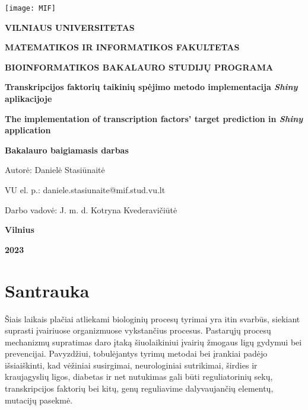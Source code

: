 \documentclass[12pt]{article}
\begin{document}

\begin{titlepage}
\vskip 20pt
\begin{center}
\texttt{[image: MIF]}
\end{center}


\vskip 20pt
\centerline{\bf \large \textbf{VILNIAUS UNIVERSITETAS}}
\bigskip
\centerline{\large \textbf{MATEMATIKOS IR INFORMATIKOS FAKULTETAS}}
\bigskip
\centerline{\large \textbf{BIOINFORMATIKOS BAKALAURO STUDIJŲ PROGRAMA}}



\vskip 90pt
\begin{center}
    {\bf \LARGE Transkripcijos faktorių taikinių spėjimo metodo implementacija
    \emph{Shiny} aplikacijoje}
\end{center}
\begin{center}
    {\bf \Large The implementation of transcription factors' target prediction
    in \emph{Shiny} application}
\end{center}
\vskip 20pt
\centerline{\bf \large \textbf{Bakalauro baigiamasis darbas}}
\bigskip
\vskip 40pt

\hskip 140pt {\large Autorė: Danielė Stasiūnaitė}

\hskip 140pt{\large VU el. p.: daniele.stasiunaite@mif.stud.vu.lt}
\bigskip
\vskip 20pt

\hskip 140pt {\large Darbo vadovė: J. m. d. Kotryna Kvederavičiūtė}
\vskip 60pt
\vskip 40pt
\centerline{\large \textbf{Vilnius}}
\centerline{\large \textbf{2023}}
\newpage
\end{titlepage}



\tableofcontents
\newpage


\section*{Santrauka}
Šiais laikais plačiai atliekami biologinių procesų tyrimai yra itin svarbūs,
siekiant suprasti įvairiuose organizmuose vykstančius procesus. Pastarųjų
procesų mechanizmų supratimas daro įtaką šiuolaikiniui įvairių žmogaus ligų
gydymui bei prevencijai. Pavyzdžiui, tobulėjantys tyrimų metodai bei įrankiai
padėjo išsiaiškinti, kad vėžiniai susirgimai, neurologiniai sutrikimai, širdies
ir kraujagyslių ligos, diabetas ir net nutukimas gali būti reguliatorinių sekų, 
transkripcijos faktorių bei kitų, genų reguliavime dalyvaujančių elementų,
mutacijų pasekmė\cite{ARTICLE0}.
\end{document}
